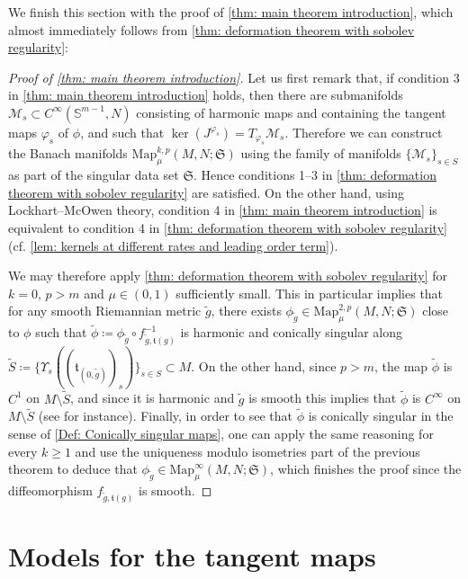 \documentclass{article}
\numberwithin{equation}{section}        %
\theoremstyle{bfnote}
\theoremstyle{definition}
\theoremstyle{bfremark}
\newcommand{\Sp}{\mathbb{S}}                %
\newcommand{\Map}{\mathrm{Map}}             %
\begin{document}
We finish this section with the proof of \cref{thm: main theorem introduction}, which almost immediately follows from \cref{thm: deformation theorem with sobolev regularity}:

\begin{proof}[Proof of \cref{thm: main theorem introduction}]
    Let us first remark that, if condition 3 in \cref{thm: main theorem introduction} holds, then there are submanifolds $\mathcal{M}_s \subset C^\infty(\Sp^{m-1},N)$ consisting of harmonic maps and containing the tangent maps $\varphi_s$ of $\phi$, and such that $\ker(J^{\varphi_s}) = T_{\varphi_s} \mathcal{M}_s$. Therefore we can construct the Banach manifolds $\Map^{k,p}_\mu(M,N;\mathfrak{S})$ using the family of manifolds $\{\mathcal{M}_s\}_{s \in S}$ as part of the singular data set $\mathfrak{S}$. Hence conditions 1--3 in \cref{thm: deformation theorem with sobolev regularity} are satisfied. On the other hand, using Lockhart--McOwen theory, condition 4 in \cref{thm: main theorem introduction} is equivalent to condition 4 in \cref{thm: deformation theorem with sobolev regularity} (cf. \cref{lem: kernels at different rates and leading order term}).

    We may therefore apply \cref{thm: deformation theorem with sobolev regularity} for $k=0$, $p > m$ and $\mu \in (0,1)$ sufficiently small. This in particular implies that for any smooth Riemannian metric $\tilde{g}$, there exists $\phi_{\tilde{g}} \in \Map^{2,p}_\mu(M,N;\mathfrak{S})$ close to $\phi$ such that $\tilde{\phi} \coloneqq \phi_{\tilde{g}} \circ f_{\tilde{g},\mathfrak{t}(g)}^{-1}$ is harmonic and conically singular along $\tilde{S} \coloneqq \{\Upsilon_s((\mathfrak{t}_{(0,\tilde{g})})_s)\}_{s\in S} \subset M$. On the other hand, since $p > m$, the map $\tilde{\phi}$ is $C^1$ on $M \setminus \tilde{S}$, and since it is harmonic and $\tilde{g}$ is smooth this implies that $\tilde{\phi}$ is $C^\infty$ on $M \setminus \tilde{S}$ (see \cite[Th. 9.4.1]{Jost2011GeometricAnalysisBook} for instance). Finally, in order to see that $\tilde{\phi}$ is conically singular in the sense of \cref{Def: Conically singular maps}, one can apply the same reasoning for every $k \geq 1$ and use the uniqueness modulo isometries part of the previous theorem to deduce that $\phi_{\tilde{g}} \in \Map^\infty_\mu(M,N;\mathfrak{S})$, which finishes the proof since the diffeomorphism $f_{\tilde{g},\mathfrak{t}(g)}$ is smooth.
\end{proof}


    \section{Models for the tangent maps}       \label{sec: Models for the tangent maps}
\end{document}
